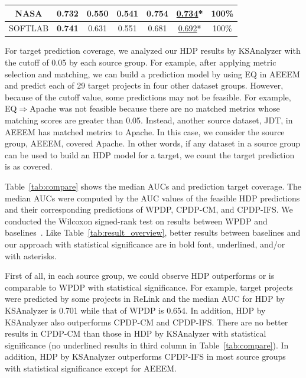 \begin{table}[t]
\begin{tabular}{|@{ }c@{ }|@{ }c@{ }|@{ }c@{ }|@{ }c@{ }|@{ }c@{ }|@{ }c@{ }||@{ }c@{ }|}
NASA        &0.732  &0.550  &0.541  &0.754  &\underline{0.734}*       &100\%\\ \hline %
SOFTLAB     &{\bf 0.741}    &0.631  &0.551  &0.681  &\underline{0.692}*      &100\%\\ \hline	%



\end{tabular}
\end{table}
For target prediction coverage, we analyzed our HDP results by KSAnalyzer with
the cutoff of 0.05 by each source group. For example, after applying
metric selection and matching, we can build a prediction model by using EQ in
AEEEM and predict each of 29 target projects in four other dataset
groups. However, because of the cutoff value, some predictions may not be
feasible. For example, EQ$\Rightarrow$Apache was not feasible because there are
no matched metrics whose matching scores are greater than 0.05.
Instead, another source dataset, JDT, in AEEEM has
matched metrics to Apache. In this case, we consider
the source group, AEEEM, covered Apache. In other words, if
any dataset in a source group can be used to build an HDP model for a target, we
count the target prediction is as covered.

Table~\ref{tab:compare} shows the median AUCs and
prediction target coverage. The median AUCs were computed by the AUC
values of the feasible HDP predictions and their corresponding predictions of
WPDP, CPDP-CM, and CPDP-IFS. We conducted the Wilcoxon
signed-rank test on results between WPDP and baselines~\cite{Wilcoxon45}. Like
Table~\ref{tab:result_overview}, better results between baselines and our
approach with statistical significance are in bold font, underlined, and/or with
asterisks.%

First of all, in each source group, we could observe HDP outperforms or is
comparable to WPDP with statistical significance.
For example, target projects were predicted by some projects in ReLink and
the median AUC for HDP by KSAnalyzer is 0.701 while that of
WPDP is 0.654. In addition,
HDP by KSAnalyzer also
outperforms CPDP-CM and CPDP-IFS.
There are no better results in CPDP-CM
than those in HDP by KSAnalyzer with statistical significance (no
underlined results in third column in Table~\ref{tab:compare}). In addition, HDP
by KSAnalyzer outperforms CPDP-IFS in most source groups with statistical significance except for AEEEM.

